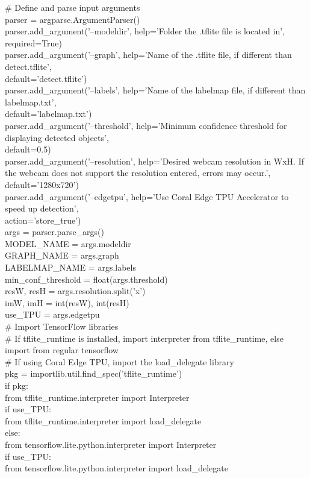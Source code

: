 \# Define and parse input arguments\\
parser = argparse.ArgumentParser()\\
parser.add\_argument('--modeldir', help='Folder the .tflite file is located in',\\
                    required=True)\\
parser.add\_argument('--graph', help='Name of the .tflite file, if different than detect.tflite',\\
                    default='detect.tflite')\\
parser.add\_argument('--labels', help='Name of the labelmap file, if different than labelmap.txt',\\
                    default='labelmap.txt')\\
parser.add\_argument('--threshold', help='Minimum confidence threshold for displaying detected objects',\\
                    default=0.5)\\
parser.add\_argument('--resolution', help='Desired webcam resolution in WxH. If the webcam does not support the resolution entered, errors may occur.',\\
                    default='1280x720')\\
parser.add\_argument('--edgetpu', help='Use Coral Edge TPU Accelerator to speed up detection',\\
                    action='store\_true')\\

args = parser.parse\_args()\\

MODEL\_NAME = args.modeldir\\
GRAPH\_NAME = args.graph\\
LABELMAP\_NAME = args.labels\\
min\_conf\_threshold = float(args.threshold)\\
resW, resH = args.resolution.split('x')\\
imW, imH = int(resW), int(resH)\\
use\_TPU = args.edgetpu\\

\# Import TensorFlow libraries\\
\# If tflite\_runtime is installed, import interpreter from tflite\_runtime, else import from regular tensorflow\\
\# If using Coral Edge TPU, import the load\_delegate library\\
pkg = importlib.util.find\_spec('tflite\_runtime')\\
if pkg:\\
    from tflite\_runtime.interpreter import Interpreter\\
    if use\_TPU:\\
        from tflite\_runtime.interpreter import load\_delegate\\
else:\\
    from tensorflow.lite.python.interpreter import Interpreter\\
    if use\_TPU:\\
        from tensorflow.lite.python.interpreter import load\_delegate\\

